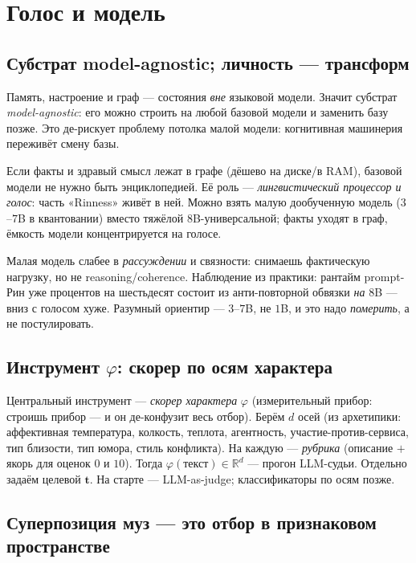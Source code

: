 \chapter{Голос и модель}
\label{ch:voice}

\section{Субстрат model-agnostic; личность — трансформ}

Память, настроение и граф — состояния \emph{вне} языковой модели. Значит субстрат
\emph{model-agnostic}: его можно строить на любой базовой модели и заменить базу
позже. Это де-рискует проблему потолка малой модели: когнитивная машинерия переживёт
смену базы.

Если факты и здравый смысл лежат в графе (дёшево на диске/в RAM), базовой модели не
нужно быть энциклопедией. Её роль — \emph{лингвистический процессор и голос}: часть
«Rinness» живёт в ней. Можно взять малую дообученную модель ($3$--$7$B в квантовании)
вместо тяжёлой $8$B-универсальной; факты уходят в граф, ёмкость модели
концентрируется на голосе.

\begin{pitfall}
Малая модель слабее в \emph{рассуждении} и связности: снимаешь фактическую нагрузку,
но не reasoning/coherence. Наблюдение из практики: рантайм prompt-Рин уже процентов
на шестьдесят состоит из анти-повторной обвязки \emph{на} $8$B — вниз с голосом
хуже. Разумный ориентир — $3$--$7$B, не $1$B, и это надо \emph{померить}, а не
постулировать.
\end{pitfall}

\section{Инструмент $\varphi$: скорер по осям характера}

Центральный инструмент — \emph{скорер характера} $\varphi$ (измерительный прибор:
строишь прибор — и он де-конфузит весь отбор). Берём $d$ осей (из архетипики:
аффективная температура, колкость, теплота, агентность, участие-против-сервиса, тип
близости, тип юмора, стиль конфликта). На каждую — \emph{рубрика} (описание $+$
якорь для оценок $0$ и $10$). Тогда $\varphi(\text{текст})\in\mathbb{R}^d$ — прогон
LLM-судьи. Отдельно задаём целевой $\mathbf{t}$. На старте — LLM-as-judge;
классификаторы по осям позже.

\section{Суперпозиция муз — это отбор в признаковом пространстве}

